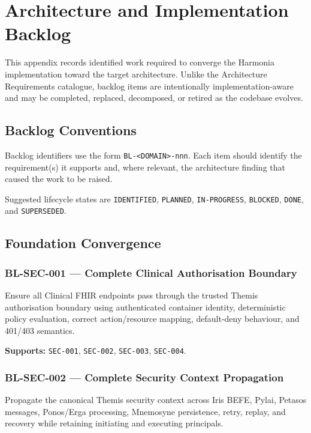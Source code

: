 
\chapter{Architecture and Implementation Backlog}
\label{app:backlog}

This appendix records identified work required to converge the Harmonia implementation toward the target architecture. Unlike the Architecture Requirements catalogue, backlog items are intentionally implementation-aware and may be completed, replaced, decomposed, or retired as the codebase evolves.

\section{Backlog Conventions}

Backlog identifiers use the form \texttt{BL-<DOMAIN>-nnn}. Each item should identify the requirement(s) it supports and, where relevant, the architecture finding that caused the work to be raised.

Suggested lifecycle states are \texttt{IDENTIFIED}, \texttt{PLANNED}, \texttt{IN-PROGRESS}, \texttt{BLOCKED}, \texttt{DONE}, and \texttt{SUPERSEDED}.

\section{Foundation Convergence}

\subsection{BL-SEC-001 --- Complete Clinical Authorisation Boundary}
Ensure all Clinical FHIR endpoints pass through the trusted Themis authorisation boundary using authenticated container identity, deterministic policy evaluation, correct action/resource mapping, default-deny behaviour, and 401/403 semantics.

\textbf{Supports:} \texttt{SEC-001}, \texttt{SEC-002}, \texttt{SEC-003}, \texttt{SEC-004}.

\subsection{BL-SEC-002 --- Complete Security Context Propagation}
Propagate the canonical Themis security context across Iris BEFE, Pylai, Petasos messages, Ponos/Erga processing, Mnemosyne persistence, retry, replay, and recovery while retaining initiating and executing principals.

